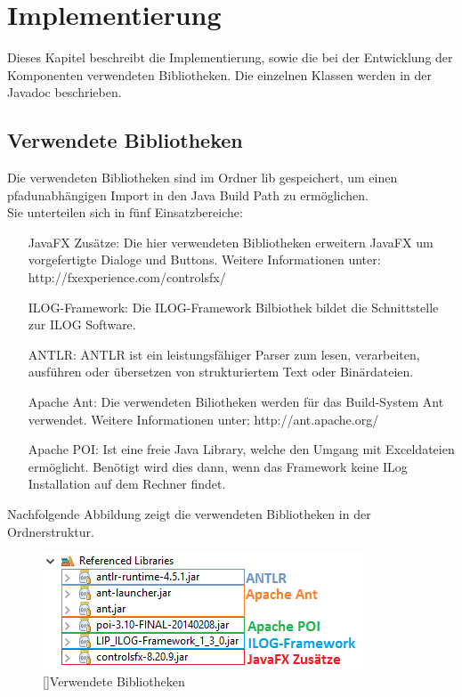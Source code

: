 \documentclass[12pt,a4paper, listof=entryprefix, bibliography=totocnumbered,toc=listofnumbered,lof=listofnumbered]{scrartcl}
\begin{document}

\section{Implementierung}
Dieses Kapitel beschreibt die Implementierung, sowie die bei der Entwicklung der Komponenten verwendeten Bibliotheken. Die einzelnen Klassen werden in der Javadoc beschrieben.
 
\subsection{Verwendete Bibliotheken}
Die verwendeten Bibliotheken sind im Ordner lib gespeichert, um einen pfadunabhängigen Import in den Java Build Path zu ermöglichen. 
\\
Sie unterteilen sich in fünf Einsatzbereiche:
\begin{itemize}
	\item[JavaFX Zusätze:] Die hier verwendeten Bibliotheken erweitern JavaFX um vorgefertigte Dialoge und Buttons. Weitere Informationen unter: http://fxexperience.com/controlsfx/
	\item[ILOG-Framework:] Die ILOG-Framework Bilbiothek bildet die Schnittstelle zur ILOG Software.
	\item[ANTLR:] \gls{ANTLR} ist ein leistungsfähiger Parser zum lesen, verarbeiten, ausführen oder übersetzen von strukturiertem Text oder Binärdateien.
	\item[Apache Ant:] Die verwendeten Biliotheken werden für das Build-System Ant verwendet. Weitere Informationen unter: http://ant.apache.org/
	\item[Apache POI:] Ist eine freie Java Library, welche den Umgang mit Exceldateien ermöglicht. Benötigt wird dies dann, wenn das Framework keine ILog Installation auf dem Rechner findet. 
\end{itemize}

Nachfolgende Abbildung zeigt die verwendeten Bibliotheken in der Ordnerstruktur.
\begin{figure}[H]
	\centering
	\includegraphics[width=0.9\linewidth]{images/libs.png} 
	[]{Verwendete Bibliotheken}
	\label{fig:libs}
\end{figure}
\end{document}
